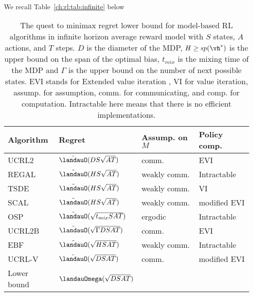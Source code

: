 We recall Table~\ref{ch:rl:tab:infinite} below

\begin{table}[ht]
\begin{tabular}{|l|l|l|l|}
\hline
Algorithm & Regret & Assump. on $M$ & Policy comp.            \\ \hline
UCRL2 \cite{jaksch2010near}       & $\tilde{\landauO}(DS\sqrt{AT})$ & comm.         & EVI \\ 
REGAL \cite{bartlett2012regal}      & $\tilde{\landauO}(HS\sqrt{AT})$  & weakly comm. & Intractable   \\ 
TSDE \cite{ouyang2017learning}        & $\tilde{\landauO}(HS\sqrt{AT})$ & weakly comm. & VI       \\ 
SCAL \cite{fruit2018efficient}        & $\tilde{\landauO}(HS\sqrt{AT})$ & weakly comm. & modified EVI           \\
OSP \cite{ortner2020regret}         & $\tilde{\landauO}(\sqrt{t_{mix}SAT})$ & ergodic           & Intractable   \\ 
UCRL2B \cite{fruit2020improved}      & $\tilde{\landauO}(\sqrt{\Gamma DSAT})$ & comm.      & EVI                           \\
EBF \cite{zhang2019regret}         & $\tilde{\landauO}(\sqrt{HSAT})$ & weakly comm.     & Intractable   \\
UCRL-V \cite{tossou2019near}         & $\tilde{\landauO}(\sqrt{DSAT})$ & comm.     & modified EVI   \\ \hline
Lower bound & $\landauOmega(\sqrt{DSAT})$ \cite{jaksch2010near} &                              &                               \\ \hline
\end{tabular}
\caption{The quest to minimax regret lower bound for model-based RL algorithms in infinite horizon average reward model with $S$ states, $A$ actions, and $T$ steps.
$D$ is the diameter of the MDP, $H\ge sp(\vh^*)$ is the upper bound on the span of the optimal bias, $t_{mix}$ is the mixing time of the MDP and $\Gamma$ is the upper bound on the number of next possible states.
EVI stands for Extended value iteration \cite{jaksch2010near}, VI for value iteration, assump. for assumption, comm. for communicating, and comp. for computation.
Intractable here means that there is no efficient implementations.
}
\label{ch:restless:tab:infinite}
\end{table}

